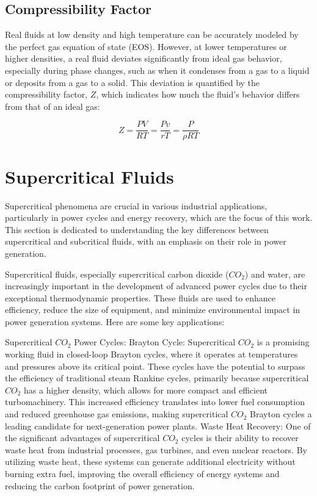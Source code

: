 	\subsection{Compressibility Factor}

	Real fluids at low density and high temperature can be accurately modeled by the perfect gas 
	equation of state (EOS). However, at lower temperatures or higher densities, a real fluid 
	deviates significantly from ideal gas behavior, especially during phase changes, such as when 
	it condenses from a gas to a liquid or deposits from a gas to a solid. This deviation is 
	quantified by the compressibility factor, $Z$, which indicates how much the fluid's behavior
	differs from that of an ideal gas:

	\begin{equation}
		Z = \frac{PV}{RT} =\frac{Pv}{rT} = \frac{P}{\rho RT} 
	\end{equation}

\section{Supercritical Fluids}

Supercritical phenomena are crucial in various industrial applications,
particularly in power cycles and energy recovery, which are the focus of this
work. This section is dedicated to understanding the key differences between
supercritical and subcritical fluids, with an emphasis on their role in power
generation.

Supercritical fluids, especially supercritical carbon dioxide ($CO_2$) and water,
are increasingly important in the development of advanced power cycles due to
their exceptional thermodynamic properties. These fluids are used to enhance
efficiency, reduce the size of equipment, and minimize environmental impact in
power generation systems. Here are some key applications:

    Supercritical $CO_2$ Power Cycles: Brayton Cycle: Supercritical $CO_2$ is a
        promising working fluid in closed-loop Brayton cycles, where it operates
        at temperatures and pressures above its critical point. These cycles
        have the potential to surpass the efficiency of traditional steam
        Rankine cycles, primarily because supercritical $CO_2$ has a higher
        density, which allows for more compact and efficient turbomachinery.
        This increased efficiency translates into lower fuel consumption and
        reduced greenhouse gas emissions, making supercritical $CO_2$ Brayton
        cycles a leading candidate for next-generation power plants. Waste Heat
        Recovery: One of the significant advantages of supercritical $CO_2$ cycles
        is their ability to recover waste heat from industrial processes, gas
        turbines, and even nuclear reactors. By utilizing waste heat, these
        systems can generate additional electricity without burning extra fuel,
        improving the overall efficiency of energy systems and reducing the
        carbon footprint of power generation.

